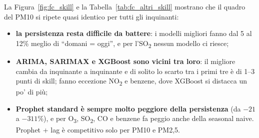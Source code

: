 \documentclass[11pt]{report}
\begin{document}
La Figura~\ref{fig:fc_skill} e la Tabella~\ref{tab:fc_altri_skill} mostrano che
il quadro del PM10 si ripete quasi identico per tutti gli inquinanti:
\begin{itemize}
  \item \textbf{la persistenza resta difficile da battere}: i modelli migliori
        fanno dal 5 al 12\% meglio di ``domani = oggi'', e per
        l'SO\textsubscript{2} nessun modello ci riesce;
  \item \textbf{ARIMA, SARIMAX e XGBoost sono vicini tra loro}: il migliore cambia
        da inquinante a inquinante e di solito lo scarto tra i primi tre è di 1--3
        punti di skill; fanno eccezione NO\textsubscript{2} e benzene, dove
        XGBoost si distacca un po' di più;
  \item \textbf{Prophet standard è sempre molto peggiore della persistenza} (da
        $-21$ a $-311$\%), e per O\textsubscript{3}, SO\textsubscript{2}, CO e
        benzene fa peggio anche della seasonal naive. Prophet + lag è competitivo
        solo per PM10 e PM2,5.
\end{itemize}
\end{document}

